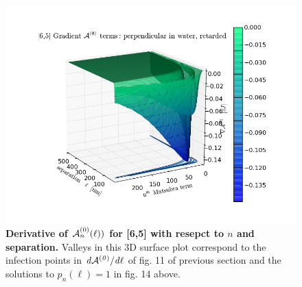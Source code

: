 \documentclass[a4paper]{article}
\begin{document}
\begin{center}
\begin{figure}[t!]
\begin{center}
\includegraphics[width=1.4\textwidth]{plots/grad_A0_65.png}
\hskip 43pt
\caption{{\bf Derivative of ${\cal A}_{n}^{(0)}(\ell))$ for [6,5] with resepct to
$n$ and separation.}  Valleys in this 3D surface plot correspond to the
infection points in $\it{d}{\cal A}^{(0)}/\it{d}\ell$ of fig. 11 of previous
section and the solutions to  $p_n(\ell)=1$ in fig. 14 above.}
\label{eiz65}
\end{center}
\end{figure} 
\end{center}
\end{document}
